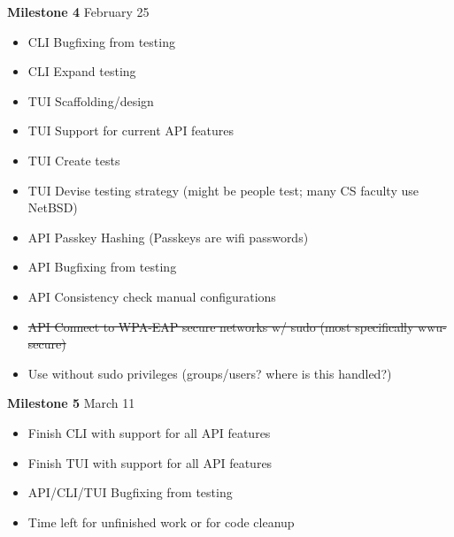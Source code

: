 \documentclass[11pt]{article}
\begin{document}
\textbf{Milestone 4} February 25
\begin{itemize}
  \item CLI Bugfixing from testing
  \item CLI Expand testing
  \item TUI Scaffolding/design
  \item TUI Support for current API features
  \item TUI Create tests
  \item TUI Devise testing strategy (might be people test; many CS faculty use NetBSD)
  \item API Passkey Hashing (Passkeys are wifi passwords)
  \item API Bugfixing from testing
  \item API Consistency check manual configurations
  \item\sout{API Connect to WPA-EAP secure networks w/ sudo (most specifically wwu-secure)}
  \item Use without sudo privileges (groups/users? where is this handled?)
\end{itemize}

\textbf{Milestone 5} March 11
\begin{itemize}
  \item Finish CLI with support for all API features
  \item Finish TUI with support for all API features
  \item API/CLI/TUI Bugfixing from testing
  \item Time left for unfinished work or for code cleanup
\end{itemize}
\end{document}
